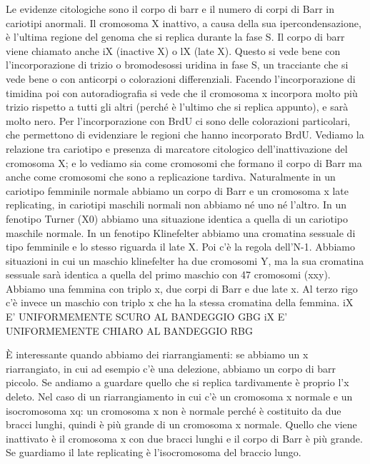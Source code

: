 \documentclass[11pt]{book}
\begin{document}
Le evidenze citologiche sono il corpo di barr e il numero di corpi di Barr in cariotipi anormali.
Il cromosoma X inattivo, a causa della sua ipercondensazione, è l’ultima regione del genoma che si replica durante la fase S. Il corpo di barr viene chiamato anche iX (inactive X) o lX (late X).
Questo si vede bene con l’incorporazione di trizio o bromodesossi uridina in fase S, un tracciante che si vede bene o con anticorpi o colorazioni differenziali.
Facendo l’incorporazione di timidina poi con autoradiografia si vede che il cromosoma x incorpora
molto più trizio rispetto a tutti gli altri (perché è l’ultimo che si replica appunto), e sarà molto nero.
Per l’incorporazione con BrdU ci sono delle colorazioni particolari, che permettono di evidenziare le regioni che hanno incorporato BrdU.
Vediamo la relazione tra cariotipo e presenza di marcatore citologico dell’inattivazione del cromosoma X; e lo vediamo sia come cromosomi che formano il corpo di Barr ma anche come cromosomi che sono a replicazione tardiva. Naturalmente in un cariotipo femminile normale abbiamo un corpo di Barr e un cromosoma x late replicating, in cariotipi maschili normali non abbiamo né uno né l’altro. In un fenotipo Turner (X0) abbiamo una situazione identica a quella di un cariotipo maschile normale. In un fenotipo Klinefelter abbiamo una cromatina sessuale di tipo femminile e lo stesso riguarda il late X. Poi c’è la regola dell’N-1. Abbiamo situazioni in cui un maschio klinefelter ha due cromosomi Y, ma la sua cromatina sessuale sarà identica a quella del primo maschio con 47 cromosomi (xxy). Abbiamo una femmina con triplo x, due corpi di Barr e due late x. Al terzo rigo c’è invece un maschio con triplo x che ha la stessa cromatina della femmina. 
iX E’ UNIFORMEMENTE SCURO AL BANDEGGIO GBG
iX E’ UNIFORMEMENTE CHIARO AL BANDEGGIO RBG



È interessante quando abbiamo dei riarrangiamenti: se abbiamo un x riarrangiato, in cui ad esempio c’è una delezione, abbiamo un corpo di barr piccolo. Se andiamo a guardare quello che si replica tardivamente è proprio l’x deleto. Nel caso di un riarrangiamento in cui c’è un cromosoma x normale e un isocromosoma xq: un cromosoma x non è normale perché è costituito da due bracci lunghi, quindi è più grande di un cromosoma x normale. Quello che viene inattivato è il cromosoma x con due bracci lunghi e il corpo di Barr è più grande. Se guardiamo il late replicating è l’isocromosoma del braccio lungo.
\end{document}
